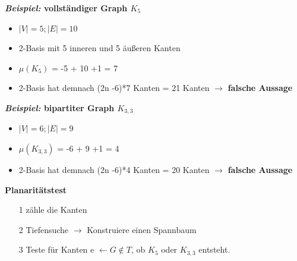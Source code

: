 \textbf{\textit{Beispiel:} vollständiger Graph $K_5$} \newline
\begin{itemize}
	\item $|V| = 5 ; |E| = 10$
	\item 2-Basis mit 5 inneren und 5 äußeren Kanten
	\item $\mu(K_5)$ = -5 + 10 +1 = 7
	\item 2-Basis hat demnach (2n -6)*7 Kanten = 21 Kanten $\rightarrow$ \newline \textbf{falsche Aussage}
\end{itemize}	
\textbf{\textit{Beispiel:} bipartiter Graph $K_{3,3}$} \newline
\begin{itemize}
	\item $|V| = 6 ; |E| = 9$
	\item $\mu(K_{3,3})$ = -6 + 9 +1 = 4
	\item 2-Basis hat demnach (2n -6)*4 Kanten = 20 Kanten $\rightarrow$ \newline \textbf{falsche Aussage}
\end{itemize}
\textbf{Planaritätstest}
\begin{itemize}
	\item[1] zähle die Kanten 
	\item[2] Tiefensuche $\rightarrow$ Konstruiere einen Spannbaum
	\item[3] Teste für Kanten e $\leftarrow G \notin T$, ob $K_5$ oder $K_{3,3}$ entsteht.
\end{itemize}